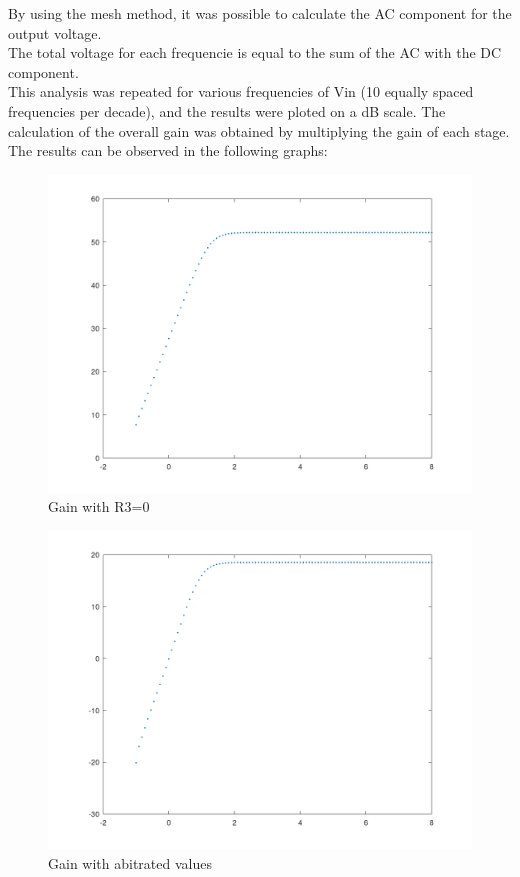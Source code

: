 \FloatBarrier

By using the mesh method, it was possible to calculate the AC component for the output voltage.\\
The total voltage for each frequencie is equal to the sum of the AC with the DC component.\\

This analysis was repeated for various frequencies of Vin (10 equally spaced frequencies per decade), and the results were ploted on a dB scale.
The calculation of the overall gain was obtained by multiplying the gain of each stage. The results can be observed in the following graphs:\\ 




\begin{figure} [!htb] 
  \includegraphics[width=\linewidth]{GAINVERDADEIRO.png}
  \caption{Gain with R3=0}
  \label{fig:theoplots}
  \endminipage\hfill
\end{figure}


\begin{figure} [!htb] 
  \includegraphics[width=\linewidth]{GAIN_Exprimental_R3_a_0.png}
  \caption{Gain with abitrated values}
  \label{fig:theoplots}
  \endminipage\hfill
\end{figure}

\FloatBarrier




